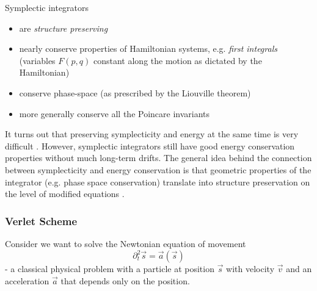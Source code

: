 Symplectic integrators

\begin{itemize}
  \item are \textit{structure preserving}
  \item nearly conserve properties of Hamiltonian systems, e.g. \textit{first integrals} (variables $F(p,q)$ constant along the motion as dictated by the Hamiltonian)
  \item conserve phase-space (as prescribed by the Liouville theorem)
  \item more generally conserve all the Poincare invariants
\end{itemize}


It turns out that preserving symplecticity and energy at the same time is very difficult \citep{Hairer06b}. However, symplectic integrators still have good energy conservation properties without much long-term drifts. The general idea behind the connection between symplecticity and energy conservation is that geometric properties of the integrator (e.g. phase space conservation) translate into structure preservation on the level of modified equations \citep[preface and chapters X through XII]{Hairer06}.



\subsubsection{Verlet Scheme}
Consider we want to solve the Newtonian equation of movement
\begin{equation}
  \partial_t^2 \vec{s} = \vec{a}(\vec{s})
\end{equation}
- a classical physical problem with a particle at position $\vec{s}$ with velocity $\vec{v}$ and an acceleration $\vec{a}$ that depends only on the position.

